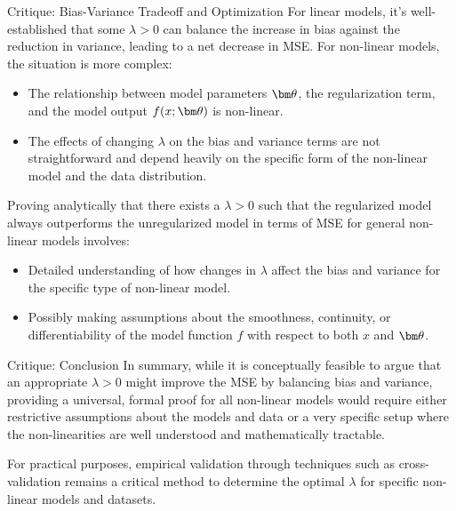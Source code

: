 \documentclass[11pt,compress,t,notes=noshow, xcolor=table]{beamer}
\begin{document}
\begin{vbframe}{Critique: Bias-Variance Tradeoff and Optimization}
For linear models, it's well-established that some \(\lambda > 0\) can balance the increase in bias against the reduction in variance, leading to a net decrease in MSE. For non-linear models, the situation is more complex:

\begin{itemize}
    \item The relationship between model parameters \(\thetav\), the regularization term, and the model output \(f(x; \thetav)\) is non-linear.
    \item The effects of changing \(\lambda\) on the bias and variance terms are not straightforward and depend heavily on the specific form of the non-linear model and the data distribution.
\end{itemize}
Proving analytically that there exists a \(\lambda > 0\) such that the regularized model always outperforms the unregularized model in terms of MSE for general non-linear models involves:

\begin{itemize}
    \item Detailed understanding of how changes in \(\lambda\) affect the bias and variance for the specific type of non-linear model.
    \item Possibly making assumptions about the smoothness, continuity, or differentiability of the model function \(f\) with respect to both \(x\) and \(\thetav\).
\end{itemize}


\end{vbframe}


\begin{vbframe}{Critique: Conclusion}
In summary, while it is conceptually feasible to argue that an appropriate \(\lambda > 0\) might improve the MSE by balancing bias and variance, providing a universal, formal proof for all non-linear models would require either restrictive assumptions about the models and data or a very specific setup where the non-linearities are well understood and mathematically tractable.

For practical purposes, empirical validation through techniques such as cross-validation remains a critical method to determine the optimal \(\lambda\) for specific non-linear models and datasets.
\end{vbframe}
\end{document}
